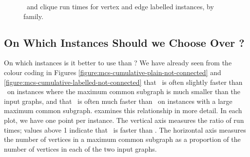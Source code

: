 \begin{figure}[htb]
{        \label{figure:mcs33ved-runtime-mcsplitdown-clique-bv}
    }
    \caption{\McSplitDown\ and clique run times for vertex and edge labelled instances, by family.}
    \label{figure:mcs33ved-runtime-mcsplitdown-clique-scatters}
\end{figure}


\FloatBarrier


\subsection{On Which Instances Should we Choose \McSplit{$\downarrow$}
    Over \McSplit?}\label{sec:which-mcsplit-down}

On which instances is it better to use \McSplit{$\downarrow$} than \McSplit?
We have already seen from the colour coding in Figures
\ref{figure:mcs-cumulative-plain-not-connected} and
\ref{figure:mcs-cumulative-labelled-not-connected}
that \McSplit\ is often slightly faster than \McSplitDown\ on instances where
the maximum common subgraph is much smaller than the input graphs, and that
\McSplitDown\ is often much faster than \McSplit\ on instances with a large
maximum common subgraph.  
examines this relationship in more detail.  In each plot, we have one
point per instance.  The vertical axis measures the ratio of run times;
values above 1 indicate that \McSplitDown\ is faster than \McSplit.
The horizontal axis measures the number of vertices in a maximum
common subgraph as a proportion of the number of vertices in each
of the two input graphs.

